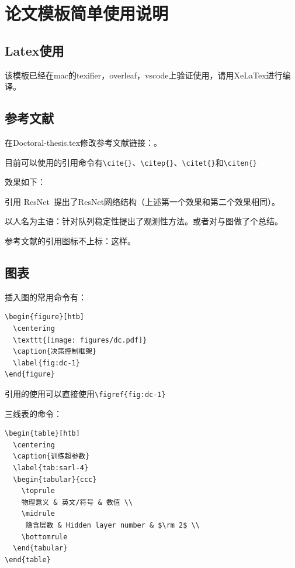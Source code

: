 \chapter{论文模板简单使用说明}
\section{Latex使用}
该模板已经在mac的texifier，overleaf，vscode上验证使用，请用XeLaTex进行编译。

\section{参考文献}

在Doctoral-thesis.tex修改参考文献链接：\lstinline!!。

目前可以使用的引用命令有\lstinline!\cite{}!、\lstinline!\citep{}!、\lstinline!\citet{}!和\lstinline!\citen{}!

效果如下：

引用 ResNet~\cite{2020_aradi_Survey}提出了ResNet网络结构\citep{2020_aradi_Survey}（上述第一个效果和第二个效果相同）。

以人名为主语：\citet{2017_qinxiaohui_FeiYunZhiCheLiangDuiLieDeFenBuShiKongZhi}针对队列稳定性提出了观测性方法。或者\citet{2021_chen_Graph}对与图做了个总结。

参考文献的引用图标不上标：这样。

\section{图表}
插入图的常用命令有：
\begin{lstlisting}
\begin{figure}[htb]
  \centering
  \texttt{[image: figures/dc.pdf]}
  \caption{决策控制框架}
  \label{fig:dc-1}
\end{figure}
\end{lstlisting}

引用的使用可以直接使用\lstinline!\figref{fig:dc-1}!

三线表的命令：
\begin{lstlisting}
\begin{table}[htb]
  \centering
  \caption{训练超参数}
  \label{tab:sarl-4}
  \begin{tabular}{ccc}
	\toprule
	物理意义 & 英文/符号 & 数值 \\ 
	\midrule
	 隐含层数 & Hidden layer number & $\rm 2$ \\
	\bottomrule
  \end{tabular}
\end{table}
\end{lstlisting}

